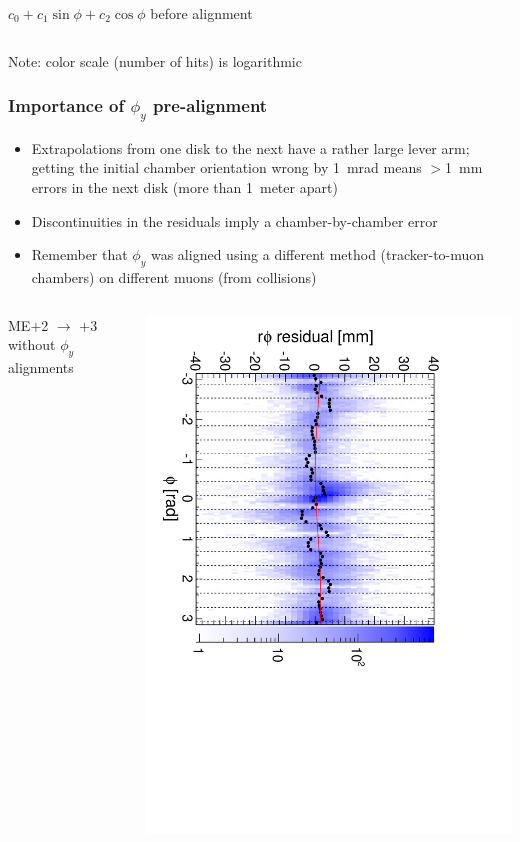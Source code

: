 \documentclass[compress]{beamer}
\begin{document}
\begin{frame}
\begin{columns}

\centering $c_0 + c_1\sin\phi + c_2\cos\phi$ before alignment


\centering {}

\end{columns}

Note: color scale (number of hits) is logarithmic
\end{frame}

\begin{frame}
\frametitle{Importance of $\phi_y$ pre-alignment}

\begin{itemize}
\item Extrapolations from one disk to the next have a rather large
  lever arm; getting the initial chamber orientation wrong by 1~mrad
  means $>$1~mm errors in the next disk (more than 1~meter
  apart)

\item Discontinuities in the residuals imply a chamber-by-chamber error

\item Remember that $\phi_y$ was aligned using a different method
  (tracker-to-muon chambers) on different muons (from collisions)
\end{itemize}

\begin{columns}
\centering ME$+$2 $\to$ $+$3 without $\phi_y$ alignments

\includegraphics[height=\linewidth, angle=90]{diskiter02_phiyzero_p2to3.pdf}

\column
\end{columns}
\end{frame}
\end{document}

